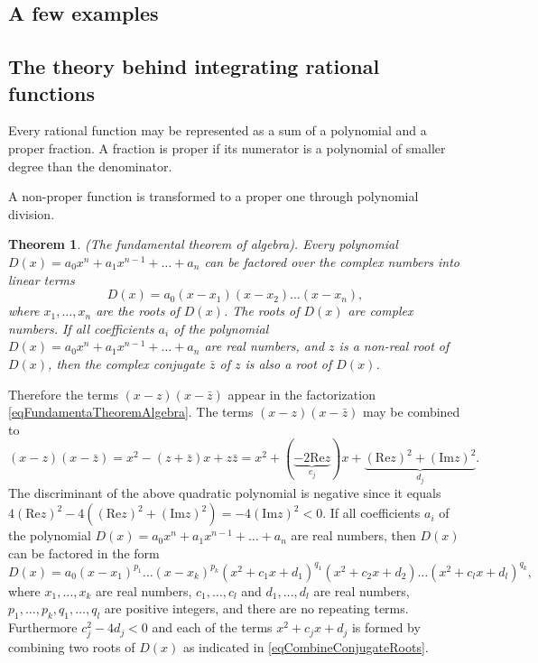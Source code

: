 \documentclass[12pt]{book}
\renewcommand{\Im}{\mathrm{Im}}
\renewcommand{\Re}{\mathrm{Re}}
\newtheorem{theorem}{Theorem}[section]
\begin{document}
\subsection{A few examples}

\subsection{The theory behind integrating rational functions}
Every rational function may be represented as a sum of a polynomial and a proper fraction. A fraction is proper if its numerator is a polynomial of smaller degree than the denominator.

A non-proper function is transformed to a proper one through polynomial
division.

\begin{theorem}(The fundamental theorem of algebra). Every polynomial $D(x)= a_0x^n+a_{1}x^{n-1}+\dots + a_n$ can be factored over the complex numbers into linear terms
\begin{equation}\label{eqFundamentaTheoremAlgebra}
D(x)=a_0(x-x_1)(x-x_2)\dots (x-x_n),
\end{equation}
where $x_1,\dots, x_n$ are the roots of $D(x)$. The roots of $D(x)$ are complex numbers.
If all coefficients $a_i$ of the polynomial $D(x)= a_0x^n+a_{1}x^{n-1}+\dots + a_n$ are real numbers, and $z$ is a non-real root of $D(x)$, then the complex conjugate $\bar z$ of $z$ is also a root of $D(x)$.
\end{theorem}

Therefore the terms  $(x-z)(x-\bar z)$ appear in the factorization \eqref{eqFundamentaTheoremAlgebra}. The terms $(x-z)(x-\bar z)$ may be combined to
\begin{equation}\label{eqCombineConjugateRoots}
(x-z)(x-\bar z)= x^2- (z+\bar z)x + z\bar z = x^{2}+ (\underbrace{-2\Re z}_{c_j})x+ \underbrace{(\Re z)^2+(\Im z)^2}_{d_j}.
\end{equation}
The discriminant of the above quadratic polynomial is negative since it equals $4(\Re z)^2- 4((\Re z)^2+(\Im z)^2)= -4(\Im z)^2<0$.
If all coefficients $a_i$ of the polynomial $D(x)= a_0x^n+a_{1}x^{n-1}+\dots + a_n$ are real numbers, then $D(x)$ can be factored in the form
\begin{equation}\label{eqFactorOverReals}
D(x)= a_0(x-x_1)^{p_1}\dots (x-x_k)^{p_k} (x^2+c_1x+d_1)^{q_1}(x^2+c_2x+d_2)\dots (x^2+c_lx +d_l)^{q_k},
\end{equation}
where $x_1, \dots, x_k$ are real numbers, $c_1, \dots, c_l$ and $d_1,\dots, d_l$ are real numbers, $p_1,\dots, p_k, q_1, \dots, q_l$ are positive integers, and there are no repeating terms. Furthermore $c_j^2-4d_j<0$ and each of the terms $x^2+c_j x+d_j$ is formed by combining two  roots of $D(x)$ as indicated in \eqref{eqCombineConjugateRoots}.
\end{document}
